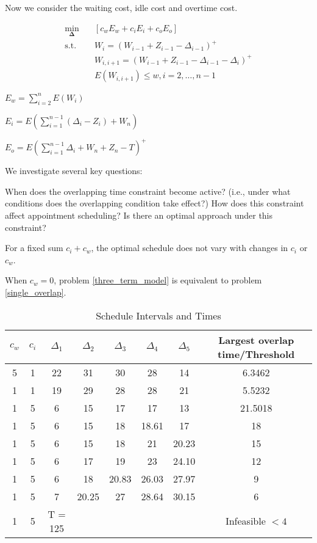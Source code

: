 \documentclass{article}
\newcommand{\D}{\bm{\Delta}}
\begin{document}

Now we consider the waiting cost, idle cost and overtime cost.

\begin{equation}
    \label{three_term_model}
    \begin{aligned}
        \min_{\D} \quad & \left[c_{w} E_{w} + c_{i} E_{i} + c_{o} E_{o} \right] \\
        \mbox{s.t.} \quad & W_{i} = (W_{i-1} + Z_{i-1} - \Delta_{i-1})^{+} \\
        & W_{i, i+1} = (W_{i-1} + Z_{i-1} - \Delta_{i-1}- \Delta_{i})^{+} \\
        & E(W_{i,i+1}) \leq w, i = 2, \ldots, n-1
    \end{aligned}
\end{equation}

$E_{w} = \sum_{i=2}^{n} E(W_{i})$

$E_{i} = E(\sum_{i=1}^{n-1} (\Delta_{i} -Z_{i}) + W_{n})$

$E_{o} = E(\sum_{i=1}^{n-1}\Delta_{i} + W_{n}+ Z_{n} - T)^{+}$


We investigate several key questions:

When does the overlapping time constraint become active? (i.e., under what conditions does the overlapping condition take effect?) How does this constraint affect appointment scheduling? Is there an optimal approach under this constraint?


For a fixed sum $c_{i} + c_{w}$, the optimal schedule does not vary with changes in $c_{i}$ or $c_{w}$.

When $c_{w} = 0$, problem \eqref{three_term_model} is equivalent to problem \eqref{single_overlap}.

\begin{table}[ht]
    \centering
    \caption{Schedule Intervals and Times}
    \begin{tabular}{cccccccc}
    \hline
    \hline
    $c_{w}$ & $c_{i}$ & $\Delta_1$ & $\Delta_2$ & $\Delta_3$ & $\Delta_4$ & $\Delta_5$ & Largest overlap time/Threshold  \\
    \hline
    5  &  1  & 22 & 31 & 30 & 28 & 14 & 6.3462 \\
    \hline
    1  &  1  & 19 & 29 & 28 & 28 & 21 & 5.5232 \\
    \hline
    1  &  5  &  6 & 15 & 17 & 17 & 13 & 21.5018  \\
    1  &  5  &  6 & 15 & 18 & 18.61 & 17 & 18 \\
    1  &  5  & 6 & 15  & 18 & 21 & 20.23 & 15 \\
    1  &  5  & 6 & 17  & 19 & 23 & 24.10 & 12 \\
    1  &  5  & 6 & 18  & 20.83 & 26.03 & 27.97 & 9 \\
    1  &  5  & 7 & 20.25  & 27 & 28.64 & 30.15 & 6 \\
    1  &  5  & T = 125 &  &    &       &       &  Infeasible  $< 4$ \\
    \hline
    \end{tabular}
  \end{table}
\end{document}
